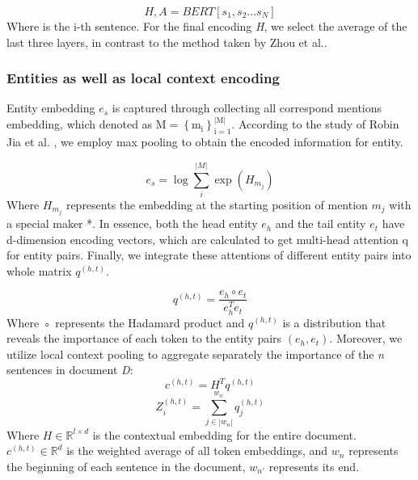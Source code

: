 \documentclass[preprint,12pt]{elsarticle}
\begin{document}
\begin{equation}
H,A= BERT[s_1,s_2 ... s_N]\label{eq2}
\end{equation}
Where is the i-th sentence. For the final encoding \emph{H}, we select the average of the last three layers, in contrast to the method taken by Zhou et al.\cite{zhou2021document}.
\subsubsection{Entities as well as local context encoding}\label{subsubsec1}

Entity embedding $e_s$  is captured through collecting all correspond mentions embedding, which denoted as $\mathrm{M}=\left\{\mathrm{m}_{\mathrm{i}}\right\}_{\mathrm{i}=1}^{\mathrm{|M|}}$. According to the study of Robin Jia et al.\cite{jia-etal-2019-document} , we employ max pooling to obtain the encoded information for entity. 

\begin{equation}
e_{s} = {\log{\sum\limits_{i}^{|M|}{\exp\left( H_{m_{j}} \right)}}}\label{eq3}
\end{equation}
Where $H_{m_{j}}$ represents the embedding at the starting position of mention $m_j$ with a special maker *. In essence, both the head entity $e_h$ and the tail entity $e_t$ have d-dimension encoding vectors, which are calculated to get multi-head attention q for entity pairs. Finally, we integrate these attentions of different entity pairs into whole matrix $q^{(h,t)}$.

\begin{equation}
q^{({h,t})} = \frac{e_{h} \circ e_{t}}{e_{h}^{T}e_{t}}\label{eq4}
\end{equation}
Where ◦ represents the Hadamard product and $q^{(h,t)}$ is a distribution that reveals the importance of each token to the entity pairs $(e_h,e_t)$. Moreover, we utilize local context pooling\cite{zhou2021document} to aggregate separately the importance of the \emph{n} sentences in document \emph{D}:
\begin{equation}
c^{({h,t})} = H^{T}q^{({h,t})}\label{eq5}
\end{equation}
\begin{equation}
Z_{i}^{({h,t})} = {\sum\limits_{j \in {|w_{n}|}}^{w_{n^{'}}}q_{j}^{({h,t})}}\label{eq6}
\end{equation}
Where $H \in \mathbb{R}^{l \times d}$ is the contextual embedding for the entire document. $c^{(h,t)} \in \mathbb{R}^d$ is the weighted average of all token embeddings, and $w_n$ represents the beginning of each sentence in the document, $w_{n'}$ represents its end.
\end{document}
